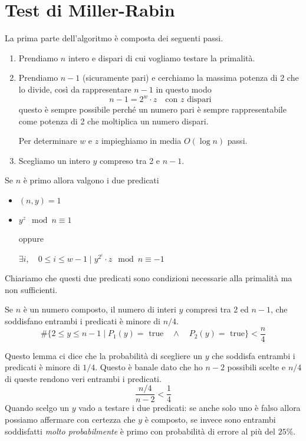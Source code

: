 \section{Test di Miller-Rabin}\label{Miller_Rabin}
La prima parte dell'algoritmo \`e composta dei seguenti passi.
\begin{enumerate}
	\item Prendiamo $n$ intero e dispari di cui vogliamo testare la primalit\`a.
	\item Prendiamo $n-1$ (sicuramente pari) e cerchiamo la massima potenza di 2 che lo divide, cos\`i da rappresentare
	      $n-1$ in questo modo
	      \[ n-1 = 2^w \cdot z \quad \text{con $z$ dispari} \]
	      questo \`e sempre possibile perch\'e un numero pari \`e sempre rappresentabile come potenza di 2 che moltiplica
	      un numero dispari.

	      Per determinare $w$ e $z$ impieghiamo in media $O(\log n)$ passi.
	\item Scegliamo un intero $y$ compreso tra 2 e $n-1$.
\end{enumerate}
Se $n$ \`e primo allora valgono i due predicati
\begin{itemize}
	\item $(n, y) = 1$
	\item $y^z \mod{n} \equiv 1$

	      oppure

	      $\exists i, \quad 0 \leq i \leq w-1 \mid y^{2^i} \cdot z \mod{n} \equiv -1$
\end{itemize}
Chiariamo che questi due predicati sono condizioni necessarie alla primalit\`a ma non sufficienti.

\begin{lemma}
	Se $n$ \`e un numero composto, il numero di interi $y$ compresi tra 2 ed $n-1$, che soddisfano entrambi i predicati
	\`e minore di $n / 4$.
	\[ \# \{ 2 \leq y \leq n-1 \mid P_1(y) = \text{ true} \quad \wedge \quad P_2(y) = \text{ true} \} < \frac{n}{4} \]
\end{lemma}
Questo lemma ci dice che la probabilit\`a di scegliere un $y$ che soddisfa entrambi i predicati \`e minore di $1 / 4$.
Questo \`e banale dato che ho $n - 2$ possibili scelte e $n / 4$ di queste rendono veri entrambi i predicati.
\[ \frac{n/4}{n-2} < \frac{1}{4} \]
Quando scelgo un $y$ vado a testare i due predicati: se anche solo uno \`e falso allora possiamo affermare con certezza
che $y$ \`e composto, se invece sono entrambi soddisfatti \emph{molto probabilmente} \`e primo con probabilit\`a di
errore al pi\`u del $25\%$.

